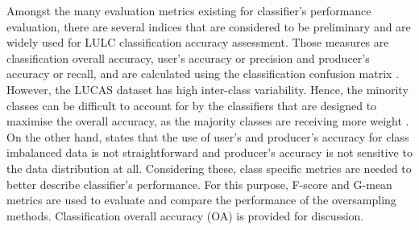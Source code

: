 \documentclass[parskip=full]{scrartcl}
\begin{document}
Amongst the many evaluation metrics existing for classifier's performance
evaluation, there are several indices that are considered to be preliminary and
are widely used for LULC classification accuracy assessment. Those measures are
classification overall accuracy, user's accuracy or precision and
producer's accuracy or recall,  and are calculated using the classification
confusion matrix \cite{Liu2007}. However, the LUCAS dataset has high
inter-class variability. Hence, the minority classes can be difficult to
account for by the classifiers that are designed to maximise the overall
accuracy, as the majority classes are receiving more weight \cite{Inglada2017}.
On the other hand, \cite{He2008} states that the use of user's and producer's
accuracy for class imbalanced data is not straightforward and producer's
accuracy is not sensitive to the data distribution at all. Considering these,
class specific metrics are needed to better describe classifier's performance.
For this purpose, F-score and G-mean metrics are used to evaluate and compare
the performance of the oversampling methods. Classification overall accuracy
(OA) is provided for discussion.
\end{document}
